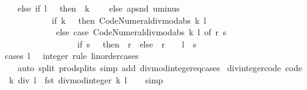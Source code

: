 \begin{isabellebody}
\ \ \ \ else\ if\ l\ {\isacharequal}{\kern0pt}\ {}\ then\ {\isacharparenleft}{\kern0pt}{}{\isacharcomma}{\kern0pt}\ k{\isacharparenright}{\kern0pt}\isanewline
\ \ \ \ else\ apsnd\ uminus\isanewline
\ \ \ \ \ \ \ \ \ \ \ \ {\isacharparenleft}{\kern0pt}if\ k\ {\isacharless}{\kern0pt}\ {}\ then\ Code{\isacharunderscore}{\kern0pt}Numeral{\isachardot}{\kern0pt}divmod{\isacharunderscore}{\kern0pt}abs\ k\ l\isanewline
\ \ \ \ \ \ \ \ \ \ \ \ \ else\ case\ Code{\isacharunderscore}{\kern0pt}Numeral{\isachardot}{\kern0pt}divmod{\isacharunderscore}{\kern0pt}abs\ k\ l\ of\ {\isacharparenleft}{\kern0pt}r{\isacharcomma}{\kern0pt}\ s{\isacharparenright}{\kern0pt}\ {\isasymRightarrow}\isanewline
\ \ \ \ \ \ \ \ \ \ \ \ \ \ \ \ \ \ if\ s\ {\isacharequal}{\kern0pt}\ {}\ then\ {\isacharparenleft}{\kern0pt}{\isacharminus}{\kern0pt}\ r{\isacharcomma}{\kern0pt}\ {}{\isacharparenright}{\kern0pt}\ else\ {\isacharparenleft}{\kern0pt}{\isacharminus}{\kern0pt}\ r\ {\isacharminus}{\kern0pt}\ {}{\isacharcomma}{\kern0pt}\ {\isacharminus}{\kern0pt}\ l\ {\isacharminus}{\kern0pt}\ s{\isacharparenright}{\kern0pt}{\isacharparenright}{\kern0pt}{\isacharparenright}{\kern0pt}{\isachardoublequoteclose}\isanewline
%
\isadelimproof
\ \ %
\endisadelimproof
%
\isatagproof
{}\isamarkupfalse%
\ {\isacharparenleft}{\kern0pt}cases\ l\ {\isachardoublequoteopen}{}\ {\isacharcolon}{\kern0pt}{\isacharcolon}{\kern0pt}\ integer{\isachardoublequoteclose}\ rule{\isacharcolon}{\kern0pt}\ linorder{\isacharunderscore}{\kern0pt}cases{\isacharparenright}{\kern0pt}\isanewline
\ \ \ \ {\isacharparenleft}{\kern0pt}auto\ split{\isacharcolon}{\kern0pt}\ prod{\isachardot}{\kern0pt}splits\ simp\ add{\isacharcolon}{\kern0pt}\ divmod{\isacharunderscore}{\kern0pt}integer{\isacharunderscore}{\kern0pt}eq{\isacharunderscore}{\kern0pt}cases{\isacharparenright}{\kern0pt}%
\endisatagproof
{\isafoldproof}%
%
\isadelimproof
\isanewline
%
\endisadelimproof
\isanewline
{}\isamarkupfalse%
\ div{\isacharunderscore}{\kern0pt}integer{\isacharunderscore}{\kern0pt}code\ {\isacharbrackleft}{\kern0pt}code{\isacharbrackright}{\kern0pt}{\isacharcolon}{\kern0pt}\isanewline
\ \ {\isachardoublequoteopen}k\ div\ l\ {\isacharequal}{\kern0pt}\ fst\ {\isacharparenleft}{\kern0pt}divmod{\isacharunderscore}{\kern0pt}integer\ k\ l{\isacharparenright}{\kern0pt}{\isachardoublequoteclose}\isanewline
%
\isadelimproof
\ \ %
\endisadelimproof
%
\isatagproof
{}\isamarkupfalse%
\ simp%
\endisatagproof
{\isafoldproof}%
%
\isadelimproof
\isanewline

\end{isabellebody}
